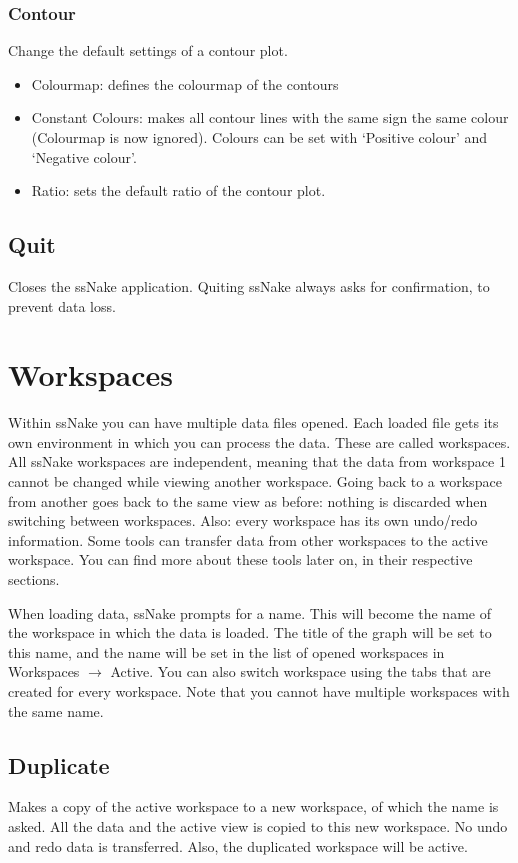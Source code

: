 \documentclass[11pt,a4paper]{article}
\begin{document}
\subsubsection{Contour}
Change the default settings of a contour plot.

\begin{itemize}
  \item Colourmap: defines the colourmap of the contours
  \item Constant Colours: makes all contour lines with the same sign the same colour (Colourmap is now ignored). Colours can be set with `Positive colour' and `Negative colour'.
  \item Ratio: sets the default ratio of the contour plot.
\end{itemize}

\subsection{Quit}
Closes the ssNake application. Quiting ssNake always asks for confirmation, to prevent data loss.

\section{Workspaces}
Within ssNake you can have multiple data files opened. Each loaded file gets its own environment in which you can process the data. These are called workspaces. All ssNake workspaces are independent, meaning that the data from workspace 1 cannot be changed while viewing another workspace. Going back to a workspace from another goes back to the same view as before:  nothing is discarded when switching between workspaces. Also: every workspace has its own undo/redo information. Some tools can transfer data from other workspaces to the active workspace. You can find more about these tools later on, in their respective sections.

When loading data, ssNake prompts for a name. This will become the name of the workspace in which the data is loaded. The title of the graph will be set to this name, and the name will be set in the list of opened workspaces in Workspaces $\rightarrow$ Active. You can also switch workspace using the tabs that are created for every workspace. Note that you cannot have multiple workspaces with the same name.

\subsection{Duplicate}
Makes a copy of the active workspace to a new workspace, of which the name is asked. All the data and the active view is copied to this new workspace. No undo and redo data is transferred. Also, the duplicated workspace will be active.
\end{document}

